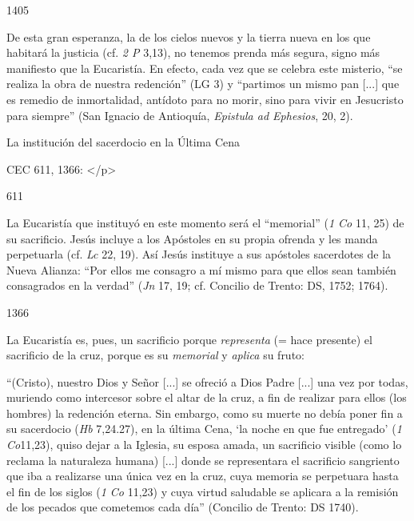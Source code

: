 			\begin{ccebody}\begin{ccenumber}1405\end{ccenumber} De esta gran esperanza, la de los cielos nuevos y la tierra nueva en los que habitará la justicia (cf. \textit{2 P} 3,13), no tenemos prenda más segura, signo más manifiesto que la Eucaristía. En efecto, cada vez que se celebra este misterio, “se realiza la obra de nuestra redención” (LG 3) y “partimos un mismo pan [...] que es remedio de inmortalidad, antídoto para no morir, sino para vivir en Jesucristo para siempre” (San Ignacio de Antioquía, \textit{Epistula ad Ephesios}, 20, 2).\end{ccebody}
			
			\begin{ccetheme}La institución del sacerdocio en la Última Cena \end{ccetheme}
			
			\begin{ccereference}\end{ccereference}CEC 611, 1366: </p>
			
			\begin{ccebody}\begin{ccenumber}611\end{ccenumber} La Eucaristía que instituyó en este momento será el “memorial” (\textit{1 Co} 11, 25) de su sacrificio. Jesús incluye a los Apóstoles en su propia ofrenda y les manda perpetuarla (cf. \textit{Lc} 22, 19). Así Jesús instituye a sus apóstoles sacerdotes de la Nueva Alianza: “Por ellos me consagro a mí mismo para que ellos sean también consagrados en la verdad” (\textit{Jn} 17, 19; cf. Concilio de Trento: DS, 1752; 1764).\end{ccebody}
			
			\begin{ccebody}\begin{ccenumber}1366\end{ccenumber} La Eucaristía es, pues, un sacrificio porque \textit{representa} (= hace presente) el sacrificio de la cruz, porque es su \textit{memorial} y \textit{aplica} su fruto:\end{ccebody}
			
			\begin{ccecite}“(Cristo), nuestro Dios y Señor [...] se ofreció a Dios Padre [...] una vez por todas, muriendo como intercesor sobre el altar de la cruz, a fin de realizar para ellos (los hombres) la redención eterna. Sin embargo, como su muerte no debía poner fin a su sacerdocio (\textit{Hb} 7,24.27), en la última Cena, ‘la noche en que fue entregado’ (\textit{1 Co}11,23), quiso dejar a la Iglesia, su esposa amada, un sacrificio visible (como lo reclama la naturaleza humana) [...] donde se representara el sacrificio sangriento que iba a realizarse una única vez en la cruz, cuya memoria se perpetuara hasta el fin de los siglos (\textit{1 Co} 11,23) y cuya virtud saludable se aplicara a la remisión de los pecados que cometemos cada día” (Concilio de Trento: DS 1740).\end{ccecite}
			
